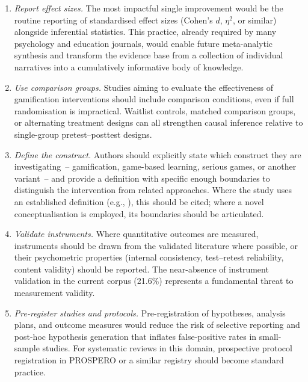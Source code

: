 \documentclass[etq]{acnsart}
\begin{document}
	\begin{enumerate}
		\item 
		
		\textit{Report effect sizes.} The most impactful single improvement would be the routine reporting of standardised effect sizes (Cohen's $d$, $\eta^2$, or similar) alongside inferential statistics. This practice, already required by many psychology and education journals, would enable future meta-analytic synthesis and transform the evidence base from a collection of individual narratives into a cumulatively informative body of knowledge.
		
		\item 
		
		\textit{Use comparison groups.} Studies aiming to evaluate the effectiveness of gamification interventions should include comparison conditions, even if full randomisation is impractical. Waitlist controls, matched comparison groups, or alternating treatment designs can all strengthen causal inference relative to single-group pretest--posttest designs.
		
		\item 
		
		\textit{Define the construct.} Authors should explicitly state which construct they are investigating~-- gamification, game-based learning, serious games, or another variant~-- and provide a definition with specific enough boundaries to distinguish the intervention from related approaches. Where the study uses an established definition (e.g., \citet{Deterding2011}), this should be cited; where a novel conceptualisation is employed, its boundaries should be articulated.
		
		\item 
		
		\textit{Validate instruments.} Where quantitative outcomes are measured, instruments should be drawn from the validated literature where possible, or their psychometric properties (internal consistency, test--retest reliability, content validity) should be reported. The near-absence of instrument validation in the current corpus (21.6\%) represents a fundamental threat to measurement validity.
		
		\item 
		
		\textit{Pre-register studies and protocols.} Pre-registration of hypotheses, analysis plans, and outcome measures would reduce the risk of selective reporting and post-hoc hypothesis generation that inflates false-positive rates in small-sample studies. For systematic reviews in this domain, prospective protocol registration in PROSPERO or a similar registry should become standard practice.
	\end{enumerate}
	
\end{document}
